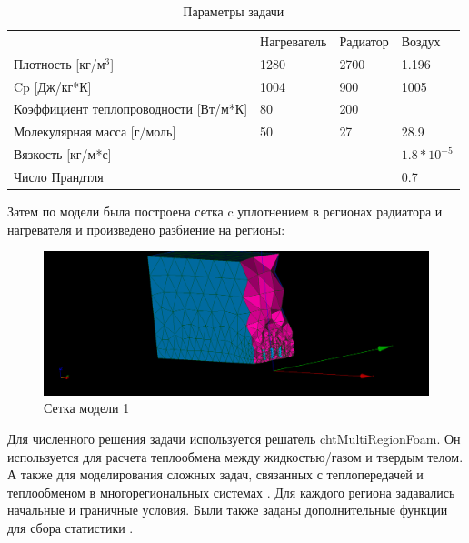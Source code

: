 \documentclass[a4paper,12pt]{article}
\theoremstyle{plain} %
\theoremstyle{definition} %
\theoremstyle{remark} %
\begin{document}
\begin{table}[h]
	\begin{tabular}{|l|l|l|l|}
		\hline
		                                          & Нагреватель & Радиатор & Воздух        \\
		Плотность {[}кг/$м^3${]}                  & 1280        & 2700     & 1.196         \\
		\hline
		Cp   {[}Дж/кг*К{]}                        & 1004        & 900      & 1005          \\
		\hline
		Коэффициент теплопроводности {[}Вт/м*К{]} & 80          & 200      &               \\
		\hline
		Молекулярная масса {[}г/моль{]}           & 50          & 27       & 28.9          \\
		\hline
		Вязкость {[}кг/м*с{]}                     &             &          & $1.8*10^{-5}$ \\
		\hline
		Число Прандтля                            &             &          & 0.7           \\
		\hline
	\end{tabular}
	\caption{Параметры задачи} %
\end{table}

Затем по модели была построена сетка c уплотнением в регионах радиатора и нагревателя и произведено разбиение на регионы:

\begin{figure}[h]
	\begin{center}
		\includegraphics[width=0.5\linewidth]{3.png}
		\caption{Сетка модели 1} %
	\end{center}
\end{figure}

\par
Для численного решения задачи используется решатель chtMultiRegionFoam.
Он используется для расчета теплообмена между жидкостью/газом и твердым телом. А также для моделирования сложных задач, связанных с теплопередачей и теплообменом в многорегиональных системах \cite{wChtMultiRegionFoam}.
Для каждого региона задавались начальные и граничные условия. Были также заданы дополнительные функции для сбора статистики \cite{aHeatTranserf}.
\end{document}
